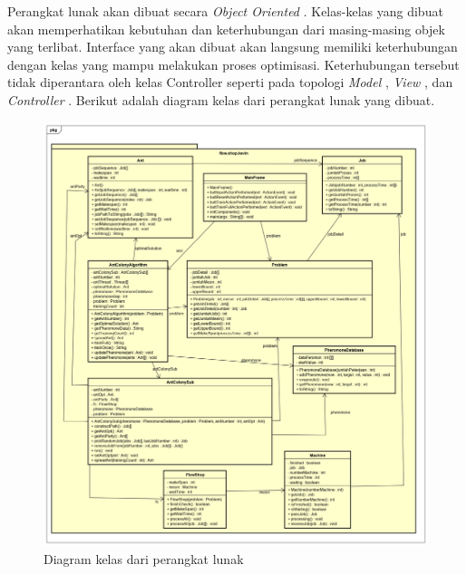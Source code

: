 	Perangkat lunak akan dibuat secara {\it Object Oriented }. Kelas-kelas yang dibuat akan memperhatikan
	kebutuhan dan keterhubungan dari masing-masing objek yang terlibat. Interface yang akan dibuat
	akan langsung memiliki keterhubungan dengan kelas yang mampu melakukan proses optimisasi.
	Keterhubungan tersebut tidak diperantara oleh kelas Controller seperti pada topologi {\it Model }, {\it View },
	dan {\it Controller }.
	\newpage
	Berikut adalah diagram kelas dari perangkat lunak yang dibuat.
	\begin{figure}[H]
		\centering
		\includegraphics[scale=0.42]{ClassDiagramLengkap}
		\caption[Diagram kelas dari perangkat lunak]{Diagram kelas dari perangkat lunak}
		\label{fig:diagramkelas}
	\end{figure}
	
